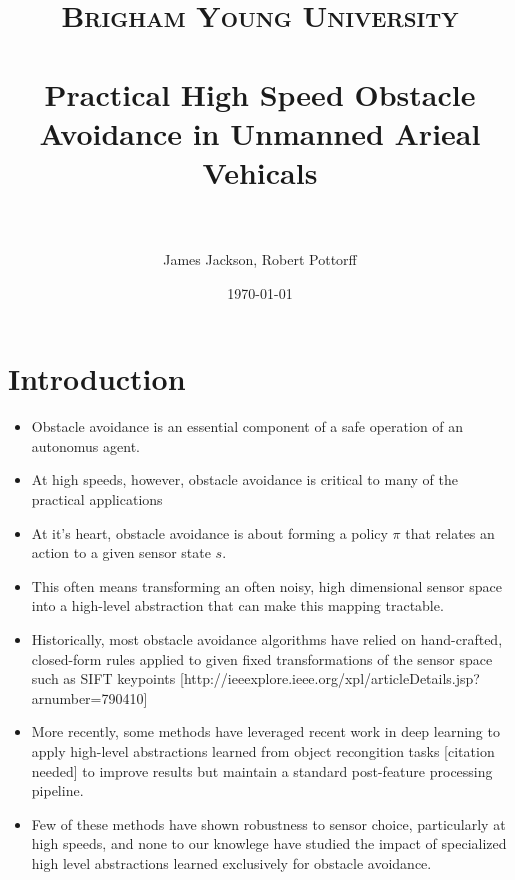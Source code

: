 \documentclass[paper=a4, fontsize=11pt]{scrartcl} %
\title{
\normalfont \normalsize
\textsc{Brigham Young University} \\ [25pt] %
\horrule{0.5pt} \\[0.4cm] %
\huge Practical High Speed Obstacle Avoidance in Unmanned Arieal Vehicals\\ %
\horrule{2pt} \\[0.5cm] %
}
\author{James Jackson, Robert Pottorff} %
\date{\normalsize\today} %
\begin{document}
\maketitle %


\section{Introduction}

\begin{itemize}
	\item	Obstacle avoidance is an essential component of a safe operation of an autonomus agent.
	\item At high speeds, however, obstacle avoidance is critical to many of the practical applications
\end{itemize}
	
\begin{itemize}
	\item At it's heart, obstacle avoidance is about forming a policy $\pi$ that relates an action to a given sensor state $s$.
	\item This often means transforming an often noisy, high dimensional sensor space into a high-level abstraction that can make this mapping tractable.
\end{itemize}
	
\begin{itemize}
	\item Historically, most obstacle avoidance algorithms have relied on hand-crafted, closed-form rules applied to given fixed transformations of the sensor space such as SIFT keypoints [http://ieeexplore.ieee.org/xpl/articleDetails.jsp?arnumber=790410]
	\item More recently, some methods have leveraged recent work in deep learning to apply high-level abstractions learned from object recongition tasks [citation needed] to improve results but maintain a standard post-feature processing pipeline.
	\item Few of these methods have shown robustness to sensor choice, particularly at high speeds, and none to our knowlege have studied the impact of specialized high level abstractions learned exclusively for obstacle avoidance.
\end{itemize}
\end{document}
